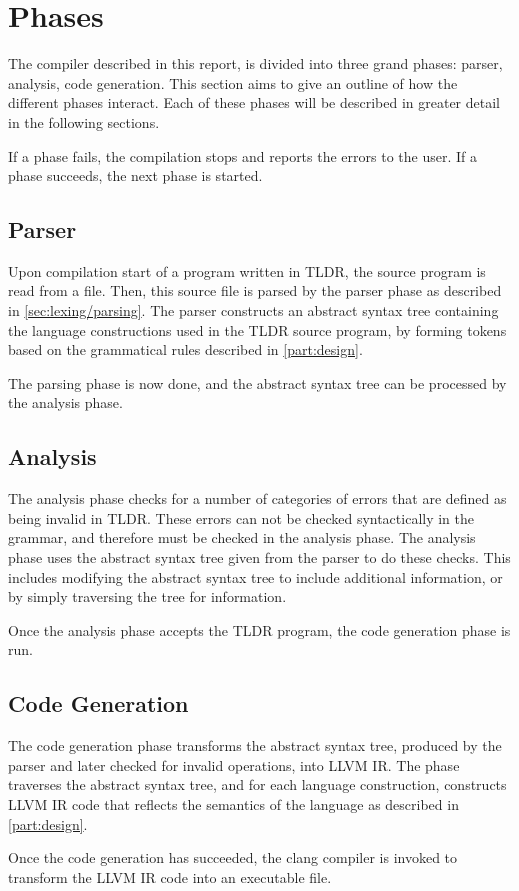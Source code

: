 \section{Phases}

The compiler described in this report, is divided into three grand phases: parser, analysis, code generation. This section aims to give an outline of how the different phases interact. Each of these phases will be described in greater detail in the following sections.

If a phase fails, the compilation stops and reports the errors to the user. If a phase succeeds, the next phase is started.

\subsection{Parser}

Upon compilation start of a program written in TLDR, the source program is read from a file. Then, this source file is parsed by the parser phase as described in \cref{sec:lexing/parsing}. The parser constructs an abstract syntax tree containing the language constructions used in the TLDR source program, by forming tokens based on the grammatical rules described in \cref{part:design}. 

The parsing phase is now done, and the abstract syntax tree can be processed by the analysis phase.

\subsection{Analysis}

The analysis phase checks for a number of categories of errors that are defined as being invalid in TLDR. These errors can not be checked syntactically in the grammar, and therefore must be checked in the analysis phase. The analysis phase uses the abstract syntax tree given from the parser to do these checks. This includes modifying the abstract syntax tree to include additional information, or by simply traversing the tree for information.

Once the analysis phase accepts the TLDR program, the code generation phase is run.

\subsection{Code Generation}

The code generation phase transforms the abstract syntax tree, produced by the parser and later checked for invalid operations, into LLVM IR. The phase traverses the abstract syntax tree, and for each language construction, constructs LLVM IR code that reflects the semantics of the language as described in \cref{part:design}.

Once the code generation has succeeded, the clang compiler is invoked to transform the LLVM IR code into an executable file.